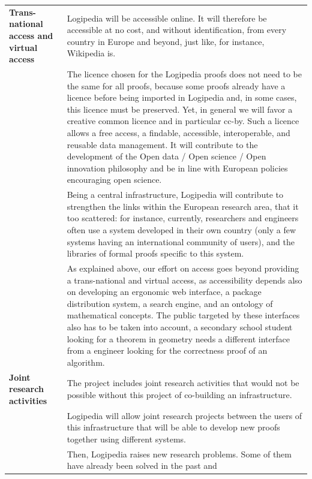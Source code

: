 \begin{longtable}{|p{}|p{}|}
\hline
{\bf Trans-national access and virtual access}
&
Logipedia will be accessible online. It will therefore be accessible
at no cost, and without identification, from every country in Europe
and beyond, just like, for instance, Wikipedia is.\\
&
\hspace{0.4cm} The licence chosen for the Logipedia proofs does not
need to be the same for all proofs, because some proofs already have a
licence before being imported in Logipedia and, in some cases, this
licence must be preserved.  Yet, in general we will favor a creative
common licence and in particular cc-by.  Such a licence allows a free
access, a findable, accessible, interoperable, and reusable data
management. It will contribute to the development of the Open data /
Open science / Open innovation philosophy and be in line with European
policies encouraging open science.
\\
&
\hspace{0.4cm} Being a central infrastructure, Logipedia will
contribute to strengthen the links within the European research area,
that it too scattered: for instance, currently, researchers and
engineers often use a system developed in their own country (only a
few systems having an international community of users), and the
libraries of formal proofs specific to this system.
\\
&
\hspace{0.4cm}
As explained above, our effort on access goes beyond providing a
trans-national and virtual access, as accessibility depends also on
developing an ergonomic web interface, a package distribution system,
a search engine, and an ontology of mathematical concepts. The public
targeted by these interfaces also has to be taken into account, a
secondary school student looking for a theorem in geometry needs a
different interface from a engineer looking for the correctness proof
of an algorithm.\\
\hline
{\bf Joint research activities}
&
The project includes joint research activities that would not be possible 
without this project of co-building an infrastructure.
\\
&
\hspace{0.4cm} Logipedia will allow joint research projects between
the users of this infrastructure that will be able to develop new
proofs together using different systems.\\
&
\hspace{0.4cm}
Then, Logipedia raises new research
problems. Some of them have already been solved in the past and

\end{longtable}
